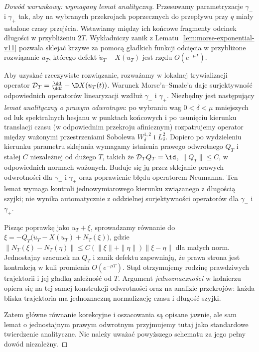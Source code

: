 \begin{proof}[Dowód warunkowy: wymagany lemat analityczny]
Przesuwamy parametryzacje $\gamma_-$ i $\gamma_+$ tak,
aby na wybranych przekrojach poprzecznych do przepływu
przy $q$ miały ustalone czasy przejścia. Wstawiamy między
ich końcowe fragmenty odcinek długości w przybliżeniu $2T$.
Wykładniczy zanik z Lematu~\ref{lem:morse-exponential-v11}
pozwala sklejać krzywe za pomocą gładkich funkcji odcięcia
w przybliżone rozwiązanie $u_T$, którego defekt
$\dot u_T-X(u_T)$ jest rzędu $O(e^{-\mu T})$.

Aby uzyskać rzeczywiste rozwiązanie, rozważamy w lokalnej
trywializacji operator
$\mathcal D_T=\tfrac{\dd}{\dd t}-\D X(u_T(t))$.
Warunek Morse'a--Smale'a daje surjektywność odpowiednich
operatorów linearyzacji wzdłuż $\gamma_-$ i $\gamma_+$.
Niezbędny jest następujący \emph{lemat analityczny o prawym
odwrotnym}: po wybraniu wag $0<\delta<\mu$ mniejszych od luk
spektralnych hesjanu w punktach końcowych i po
usunięciu kierunku translacji czasu (w odpowiednim
przekroju afinicznym) rozpatrujemy operator między
ważonymi przestrzeniami Sobolewa $W^{1,2}_\delta$
i $L^2_\delta$. Dopiero po wydzieleniu kierunku
parametru sklejania wymagamy istnienia prawego odwrotnego
$Q_T$ i stałej $C$ niezależnej od dużego $T$, takich że
$\mathcal D_TQ_T=\id$, $\|Q_T\|\le C$, w odpowiednich
normach ważonych. Buduje się ją przez sklejanie prawych
odwrotności dla $\gamma_-$ i $\gamma_+$ oraz poprawienie
błędu operatorem Neumanna. Ten lemat wymaga kontroli
jednowymiarowego kierunku związanego z długością szyjki;
nie wynika automatycznie z oddzielnej surjektywności
operatorów dla $\gamma_-$ i $\gamma_+$.

Pisząc poprawkę jako $u_T+\xi$, sprowadzamy równanie do
$\xi=-Q_T\bigl(\dot u_T-X(u_T)+N_T(\xi)\bigr)$,
gdzie $\|N_T(\xi)-N_T(\eta)\|\le
C(\|\xi\|+\|\eta\|)\|\xi-\eta\|$ dla małych norm.
Jednostajny szacunek na $Q_T$ i zanik defektu zapewniają,
że prawa strona jest kontrakcją w kuli promienia
$O(e^{-\mu T})$. Stąd otrzymujemy rodzinę prawdziwych
trajektorii i jej gładką zależność od $T$.
Argument \emph{jednoznaczności} w kołnierzu opiera się na
tej samej konstrukcji odwrotności oraz na analizie
przekrojów: każda bliska trajektoria ma jednoznaczną
normalizację czasu i długość szyjki.

Zatem główne równanie korekcyjne i oszacowania są opisane
jawnie, ale sam lemat o jednostajnym prawym odwrotnym
przyjmujemy tutaj jako standardowe twierdzenie analityczne.
Nie należy uważać powyższego schematu za jego pełny
dowód niezależny.
\end{proof}

